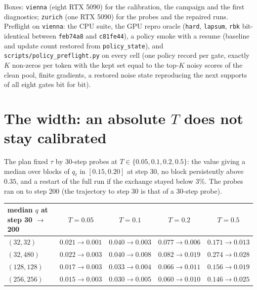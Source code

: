 \documentclass[11pt,a4paper]{article}
\newcommand{\code}[1]{\texttt{#1}}
\begin{document}
Boxes: \code{vienna} (eight RTX 5090) for the calibration, the campaign and the
first diagnostics; \code{zurich} (one RTX 5090) for the probes and the repaired
runs. Preflight on \code{vienna}: the CPU suite, the GPU repro oracle
(\code{hard}, \code{lapsum}, \code{rbk} bit-identical between \code{feb74a8} and
\code{c81fe44}), a policy smoke with a resume (baseline and update count restored
from \code{policy\_state}), and \code{scripts/policy\_preflight.py} on every cell
(one policy record per gate, exactly $K$ non-zeros per token with the kept set
equal to the top-$K$ noisy scores of the clean pool, finite gradients, a
restored noise state reproducing the next supports of all eight gates bit for bit).

\section{The width: an absolute $T$ does not stay calibrated}

The plan fixed $\tau$ by 30-step probes at $T \in \{0.05, 0.1, 0.2, 0.5\}$: the
value giving a median over blocks of $q_\ell$ in $[0.15, 0.20]$ at step 30, no
block persistently above $0.35$, and a restart of the full run if the exchange
stayed below $3\%$. The probes ran on to step 200 (the trajectory to step 30 is
that of a 30-step probe).

\begin{center}\small
\begin{tabular}{lcccc}
\toprule
median $q$ at step 30 $\to$ 200 & $T=0.05$ & $T=0.1$ & $T=0.2$ & $T=0.5$ \\
\midrule
$(32, 32)$   & $0.021 \to 0.001$ & $0.040 \to 0.003$ & $0.077 \to 0.006$ & $0.171 \to 0.013$ \\
$(32, 480)$  & $0.022 \to 0.003$ & $0.040 \to 0.008$ & $0.082 \to 0.019$ & $0.274 \to 0.028$ \\
$(128, 128)$ & $0.017 \to 0.003$ & $0.033 \to 0.004$ & $0.066 \to 0.011$ & $0.156 \to 0.019$ \\
$(256, 256)$ & $0.015 \to 0.003$ & $0.030 \to 0.005$ & $0.060 \to 0.010$ & $0.146 \to 0.025$ \\
\bottomrule
\end{tabular}
\end{center}
\end{document}
